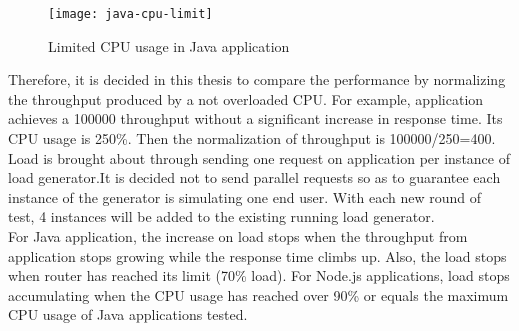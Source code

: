  \begin{figure}[h]
 	\centering
 	\texttt{[image: java-cpu-limit]}
 	\caption{Limited CPU usage in Java application}
 	\label{java-cpu-limit}
 \end{figure}
 
 Therefore, it is decided in this thesis to compare the performance by normalizing the throughput produced by a not overloaded CPU. For example, application achieves a 100000 throughput without a significant increase in response time. Its CPU usage is 250\%. Then the normalization of throughput is 100000/250=400. \\ 
Load is brought about through sending one request on application per instance of load generator.It is decided not to send parallel requests so as to guarantee each instance of the generator is simulating one end user. With each new round of test, 4 instances will be added to the existing running load generator.\\
 For Java application, the increase on load stops when the throughput from application stops growing while the response time climbs up. Also, the load stops when router has reached its limit (70\% load). For Node.js applications, load stops accumulating when the CPU usage has reached over 90\% or equals the maximum CPU usage of Java applications tested.
 
